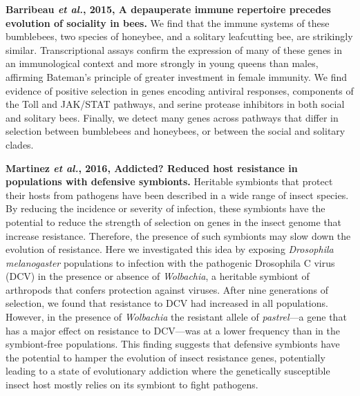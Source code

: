 \documentclass[11pt]{article}
\begin{document}
\begin{sloppypar}
\textbf{Barribeau \textit{et al.}, 2015, A depauperate immune repertoire precedes evolution of sociality in bees.} \newline
We find that the immune systems of these bumblebees, two species of honeybee, and a solitary leafcutting bee, are strikingly similar. 
Transcriptional assays confirm the expression of many of these genes in an immunological context and more strongly in young queens than males, affirming Bateman’s principle of greater investment in female immunity. 
We find evidence of positive selection in genes encoding antiviral responses, components of the Toll and JAK/STAT pathways, and serine protease inhibitors in both social and solitary bees. 
Finally, we detect many genes across pathways that differ in selection between bumblebees and honeybees, or between the social and solitary clades.

\par

\textbf{Martinez \textit{et al.}, 2016, Addicted? Reduced host resistance in populations with defensive symbionts.} \newline
Heritable symbionts that protect their hosts from pathogens have been described in a wide range of insect species. 
By reducing the incidence or severity of infection, these symbionts have the potential to reduce the strength of selection on genes in the insect genome that increase resistance. 
Therefore, the presence of such symbionts may slow down the evolution of resistance. 
Here we investigated this idea by exposing \textit{Drosophila melanogaster} populations to infection with the pathogenic Drosophila C virus (DCV) in the presence or absence of \textit{Wolbachia}, a heritable symbiont of arthropods that confers protection against viruses. 
After nine generations of selection, we found that resistance to DCV had increased in all populations. 
However, in the presence of \textit{Wolbachia} the resistant allele of \textit{pastrel}—a gene that has a major effect on resistance to DCV—was at a lower frequency than in the symbiont-free populations. 
This finding suggests that defensive symbionts have the potential to hamper the evolution of insect resistance genes, potentially leading to a state of evolutionary addiction where the genetically susceptible insect host mostly relies on its symbiont to fight pathogens.

\par



\end{sloppypar}
\end{document}
